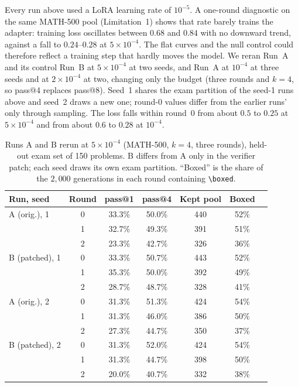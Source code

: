 \documentclass[runningheads]{llncs}
\begin{document}
Every run above used a LoRA learning rate of $10^{-5}$. A one-round diagnostic on
the same MATH-500 pool (Limitation~1) shows that rate barely trains the adapter:
training loss oscillates between $0.68$ and $0.84$ with no downward trend, against
a fall to $0.24$--$0.28$ at $5\times10^{-4}$. The flat curves and the null control
could therefore reflect a training step that hardly moves the model. We reran Run~A
and its control Run~B at $5\times10^{-4}$ at two seeds, and Run~A at $10^{-4}$ at
three seeds and at $2\times10^{-4}$ at two, changing only the budget (three rounds and $k=4$, so pass@4 replaces
pass@8). Seed~1 shares the exam partition of the seed-1 runs above and seed~2
draws a new one; round-0 values differ from the earlier runs' only through
sampling. The loss falls within round~0 from about $0.5$ to $0.25$ at
$5\times10^{-4}$ and from about $0.6$ to $0.28$ at $10^{-4}$.

\begin{table}[t]
\caption{Runs A and B rerun at $5\times10^{-4}$ (MATH-500, $k=4$, three
rounds), held-out exam set of 150 problems. B differs from A only in the
verifier patch; each seed draws its own exam partition. ``Boxed'' is the share
of the $2{,}000$ generations in each round containing
\texttt{\textbackslash boxed}.}
\label{tab:lrcheck}
\centering
\setlength{\tabcolsep}{6pt}
\begin{tabular}{lcccccc}
\toprule
Run, seed & Round & pass@1 & pass@4 & Kept pool & Boxed \\
\midrule
A (orig.), 1   & 0 & 33.3\% & 50.0\% & 440 & 52\% \\
               & 1 & 32.7\% & 49.3\% & 391 & 51\% \\
               & 2 & 23.3\% & 42.7\% & 326 & 36\% \\
B (patched), 1 & 0 & 33.3\% & 50.7\% & 443 & 52\% \\
               & 1 & 35.3\% & 50.0\% & 392 & 49\% \\
               & 2 & 28.7\% & 48.7\% & 328 & 41\% \\
\midrule
A (orig.), 2   & 0 & 31.3\% & 51.3\% & 424 & 54\% \\
               & 1 & 31.3\% & 46.0\% & 386 & 50\% \\
               & 2 & 27.3\% & 44.7\% & 350 & 37\% \\
B (patched), 2 & 0 & 31.3\% & 52.0\% & 424 & 54\% \\
               & 1 & 31.3\% & 44.7\% & 398 & 50\% \\
               & 2 & 20.0\% & 40.7\% & 332 & 38\% \\
\bottomrule
\end{tabular}
\end{table}
\end{document}
